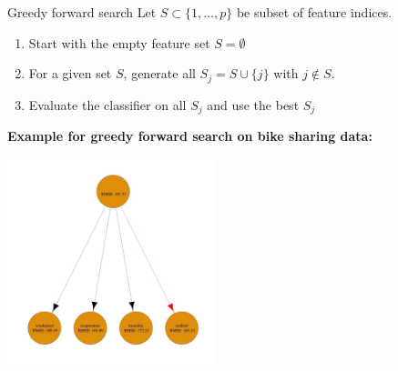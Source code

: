 \documentclass[11pt,compress,t,notes=noshow, xcolor=table]{beamer}
\begin{document}

\begin{frame}{Greedy forward search}
Let $S \subset \{1, \dots, p \}$ be subset of feature indices.
\vspace{-0.01cm}
    \begin{enumerate}
      \item Start with the empty feature set $S = \emptyset$
      \item For a given set $S$, generate all $S_j = S \cup \{j\}$ with $j \notin S$.
      \item Evaluate the classifier on all $S_j$ and use the best $S_j$
      \end{enumerate}
    \textbf{Example for greedy forward search on bike sharing data:}
    \begin{center}
    \includegraphics[width = 0.45\textwidth]{figure/fs-wrappers-powerset-tree-1.png}
    \end{center}

\end{frame}
\end{document}
